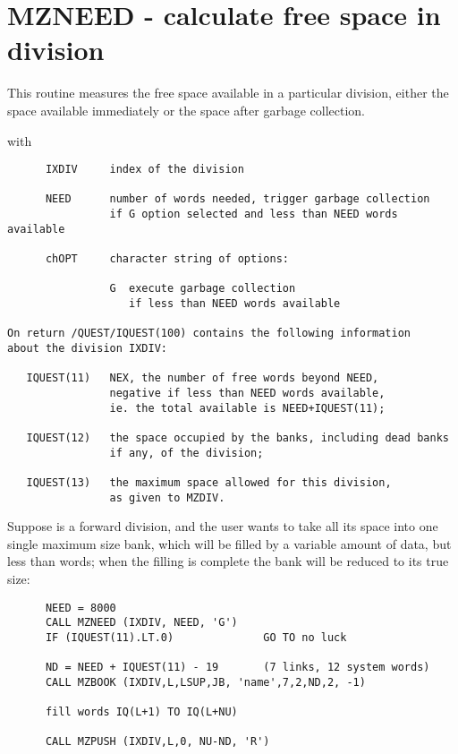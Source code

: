 \section{MZNEED - calculate free space in division}

This routine measures the free space available in a particular
division, either the space available immediately
or the space after garbage collection.


with
\begin{verbatim}
      IXDIV     index of the division

      NEED      number of words needed, trigger garbage collection
                if G option selected and less than NEED words available

      chOPT     character string of options:

                G  execute garbage collection
                   if less than NEED words available

On return /QUEST/IQUEST(100) contains the following information
about the division IXDIV:

   IQUEST(11)   NEX, the number of free words beyond NEED,
                negative if less than NEED words available,
                ie. the total available is NEED+IQUEST(11);

   IQUEST(12)   the space occupied by the banks, including dead banks
                if any, of the division;

   IQUEST(13)   the maximum space allowed for this division,
                as given to MZDIV.
\end{verbatim} 

\Example

Suppose  is a forward division, and the user wants to
take all its space into one single maximum size bank,
which will be filled by a variable amount of data, but less
than  words; when the filling is complete the bank
will be reduced to its true size:

\begin{verbatim}
      NEED = 8000
      CALL MZNEED (IXDIV, NEED, 'G')
      IF (IQUEST(11).LT.0)              GO TO no luck

      ND = NEED + IQUEST(11) - 19       (7 links, 12 system words)
      CALL MZBOOK (IXDIV,L,LSUP,JB, 'name',7,2,ND,2, -1)

      fill words IQ(L+1) TO IQ(L+NU)

      CALL MZPUSH (IXDIV,L,0, NU-ND, 'R')
\end{verbatim}


